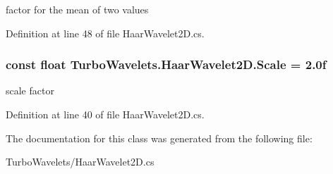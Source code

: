 factor for the mean of two values 



\-Definition at line 48 of file \-Haar\-Wavelet2\-D.\-cs.

\hypertarget{class_turbo_wavelets_1_1_haar_wavelet2_d_abb9a814259b4977ed274dde12f878f12}{
\subsubsection[{\-Scale}]{\setlength{\rightskip}{0pt plus 5cm}const float {\bf \-Turbo\-Wavelets.\-Haar\-Wavelet2\-D.\-Scale} = 2.\-0f}}\label{class_turbo_wavelets_1_1_haar_wavelet2_d_abb9a814259b4977ed274dde12f878f12}


scale factor 



\-Definition at line 40 of file \-Haar\-Wavelet2\-D.\-cs.



\-The documentation for this class was generated from the following file\-:\begin{DoxyCompactItemize}
\item 
\-Turbo\-Wavelets/\-Haar\-Wavelet2\-D.\-cs\end{DoxyCompactItemize}
